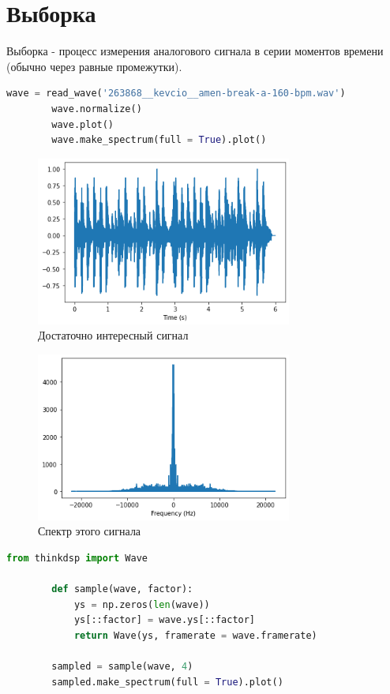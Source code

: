 \documentclass[a4paper, 12pt]{report}
\begin{document}
	\chapter{Выборка}
	Выборка - процесс измерения аналогового сигнала в серии моментов времени (обычно через равные промежутки).
	\begin{lstlisting}[language=Python,caption=Возьмем интересный сигнал]
		wave = read_wave('263868__kevcio__amen-break-a-160-bpm.wav')
		wave.normalize()
		wave.plot()
		wave.make_spectrum(full = True).plot()
	\end{lstlisting}
	\begin{figure}[H]
		\centering
		\includegraphics[width=0.75\textwidth]{samp1.png}
		\caption{Достаточно интересный сигнал}
		\label{fig:samp1}
	\end{figure}
	\begin{figure}[H]
		\centering
		\includegraphics[width=0.75\textwidth]{samp2.png}
		\caption{Спектр этого сигнала}
		\label{fig:samp2}
	\end{figure}
	\begin{lstlisting}[language=Python,caption=Функция для выборки]
		from thinkdsp import Wave

		def sample(wave, factor):	
			ys = np.zeros(len(wave))
			ys[::factor] = wave.ys[::factor]
			return Wave(ys, framerate = wave.framerate)

		sampled = sample(wave, 4)
		sampled.make_spectrum(full = True).plot()
	\end{lstlisting}
\end{document}
